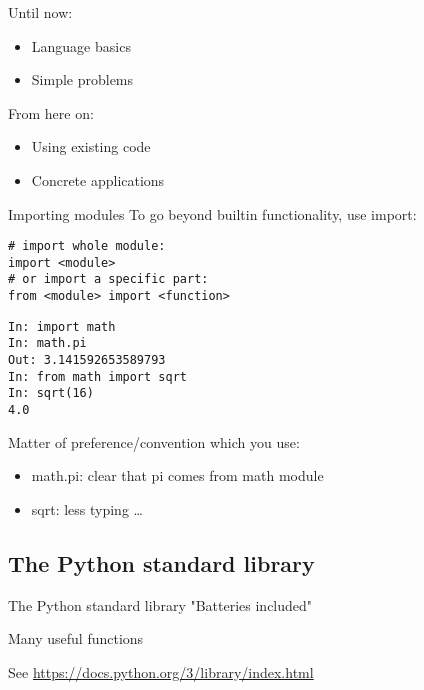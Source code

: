 \documentclass[aspectratio=169,usenames,dvipsnames]{beamer}
\begin{document}
\begin{frame}
    Until now:
        \begin{itemize}
            \item Language basics
            \item Simple problems
        \end{itemize}
    \pause
    From here on:
        \begin{itemize}
            \item Using existing code
            \item Concrete applications
        \end{itemize}
\end{frame}

\begin{frame}[fragile]{Importing modules}
To go beyond builtin functionality, use import:
\begin{lstlisting}
# import whole module:
import <module>
# or import a specific part:
from <module> import <function>
\end{lstlisting}

\pause
\begin{lstlisting}
In: import math
In: math.pi
Out: 3.141592653589793
In: from math import sqrt
In: sqrt(16)
4.0
\end{lstlisting}

Matter of preference/convention which you use:
\begin{itemize}
	\item math.pi: clear that pi comes from math module
	\item sqrt: less typing \dots
\end{itemize}
\end{frame}

\subsection{The Python standard library}
\begin{frame}[fragile]{The Python standard library}
	"Batteries included"

	\vspace{1em}
	Many useful functions

	\vspace{1em}
    See \url{https://docs.python.org/3/library/index.html}
\end{frame}
\end{document}
